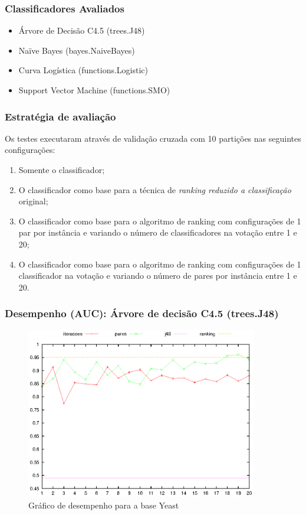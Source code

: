 \begin{frame}
    \frametitle{Classificadores Avaliados}
    
    \begin{itemize}
        \item Árvore de Decisão C4.5 (trees.J48)
        \item Naïve Bayes (bayes.NaiveBayes)
        \item Curva Logística (functions.Logistic)
        \item Support Vector Machine (functions.SMO)
    \end{itemize}
\end{frame}

\begin{frame}
    \frametitle{Estratégia de avaliação}

    Os testes executaram através de validação cruzada com 10 partições nas seguintes configurações:

    \begin{enumerate}
        \item Somente o classificador;
        \item O classificador como base para a técnica de \emph{ranking reduzido a classificação} original;
        \item O classificador como base para o algoritmo de ranking com configurações de 1 par por instância e variando o número de classificadores na votação entre 1 e 20;
        \item O classificador como base para o algoritmo de ranking com configurações de 1 classificador na votação e variando o número de pares por instância entre 1 e 20.
    \end{enumerate}
\end{frame}

\begin{frame}
    \frametitle{Desempenho (AUC): Árvore de decisão C4.5 (trees.J48)}

    \begin{figure}[H]
        \centering
        \includegraphics[width=0.9\textwidth]{img/yeast_j48.eps}
        \caption{Gráfico de desempenho para a base Yeast}
    \end{figure}
\end{frame}

